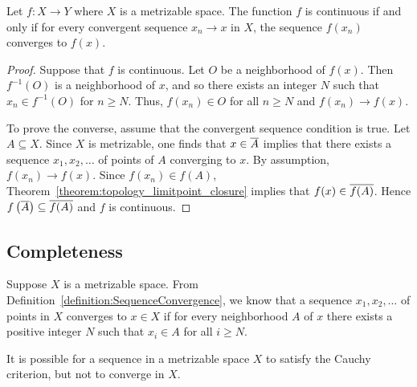 \begin{theorem}
\label{theorem:topology_limitpoint_closure}
Let $f: X \rightarrow Y$ where $X$ is a metrizable space.
The function $f$ is continuous if and only if for every convergent sequence $x_n \rightarrow x$ in $X$, the sequence $f(x_n)$ converges to $f(x)$.
\end{theorem}
\begin{proof}
Suppose that $f$ is continuous.
Let $O$ be a neighborhood of $f(x)$.
Then $f^{-1}(O)$ is a neighborhood of $x$, and so there exists an integer $N$ such that $x_n \in f^{-1}(O)$ for $n \geq N$.
Thus, $f(x_n) \in O$ for all $n \geq N$ and $f(x_n) \rightarrow f(x)$.

To prove the converse, assume that the convergent sequence condition is true.
Let $A \subseteq X$.
Since $X$ is metrizable, one finds that $x \in \overline{A}$ implies that there exists a sequence $x_1, x_2, \ldots$ of points of $A$ converging to $x$.
By assumption, $f(x_n) \rightarrow f(x)$.
Since $f(x_n) \in f(A)$, Theorem~\ref{theorem:topology_limitpoint_closure} implies that $f(x) \in \overline{f(A)}$.
Hence $f \left( \overline{A} \right) \subseteq \overline{f(A)}$ and $f$ is continuous.
\end{proof}


\subsection{Completeness}

Suppose $X$ is a metrizable space.
From Definition~\ref{definition:SequenceConvergence}, we know that a sequence $x_1, x_2, \ldots$ of points in $X$ converges to $x \in X$ if for every neighborhood $A$ of $x$ there exists a positive integer $N$ such that $x_i \in A$ for all $i \geq N$.

It is possible for a sequence in a metrizable space $X$ to satisfy the Cauchy criterion, but not to converge in $X$.

